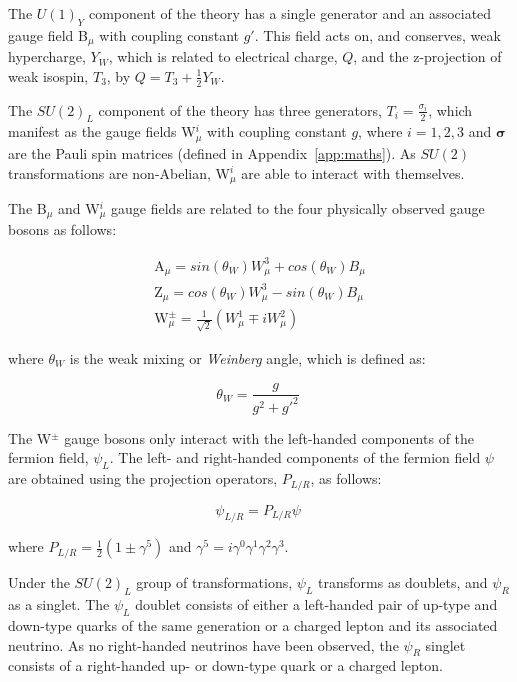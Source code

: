 The $U(1)_{Y}$ component of the theory has a single generator and an associated gauge field B$_{\mu}$ with coupling constant $g'$.
This field acts on, and conserves, weak hypercharge, $Y_{W}$, which is related to electrical charge, $Q$, and the z-projection of weak isospin, $T_{3}$, by $Q = T_{3} + \frac{1}{2} Y_{W}$.

The $SU(2)_{L}$ component of the theory has three generators, ${T_{i}} = \frac{{\sigma_{i}}}{2}$, which manifest as the gauge fields W$_{\mu}^{i}$ with coupling constant $g$, where $i = 1, 2, 3$ and $\bm{\sigma}$ are the Pauli spin matrices (defined in Appendix~\ref{app:maths}).
As $SU(2)$ transformations are non-Abelian, W$_{\mu}^{i}$ are able to interact with themselves.


The B$_{\mu}$ and W$_{\mu}^{i}$ gauge fields are related to the four physically observed gauge bosons as follows:

\begin{equation}
\begin{split}
\text{A}_{\mu} = sin(\theta_{W}) W^{3}_{\mu} + cos(\theta_{W}) B_{\mu} \\ 
\text{Z}_{\mu} = cos(\theta_{W}) W^{3}_{\mu} - sin(\theta_{W}) B_{\mu} \\ 
\text{W}^{\pm}_{\mu} = \frac{1}{\sqrt{2}} ( W^{1}_{\mu} \mp i W^{2}_{\mu} ) \;
\end{split}
\label{eq:ewBosons}
\end{equation}

where $\theta_{W}$ is the weak mixing or \emph{Weinberg} angle, which is defined as:

\begin{equation}
\theta_{W} = \frac{g}{g^{2}+g'^{2}} \;
\label{eq:weakMixingAngle}
\end{equation}

The W$^{\pm}$ gauge bosons only interact with the left-handed components of the fermion field, $\psi_{L}$.
The left- and right-handed components of the fermion field $\psi$ are obtained using the projection operators, $P_{L/R}$, as follows:

\begin{equation}
\psi_{L/R} = P_{L/R} \psi \;
\end{equation}

where $P_{L/R} = \frac{1}{2}(1 \pm \gamma^{5})$ and $\gamma^{5} =i  \gamma^{0} \gamma^{1} \gamma^{2} \gamma^{3}$. 


Under the $SU(2)_{L}$ group of transformations, $\psi_{L}$ transforms as doublets, and $\psi_{R}$ as a singlet.
The $\psi_{L}$ doublet consists of either a left-handed pair of up-type and down-type quarks of the same generation or a charged lepton and its associated neutrino.
As no right-handed neutrinos have been observed, the $\psi_{R}$ singlet consists of a right-handed up- or down-type quark or a charged lepton.

